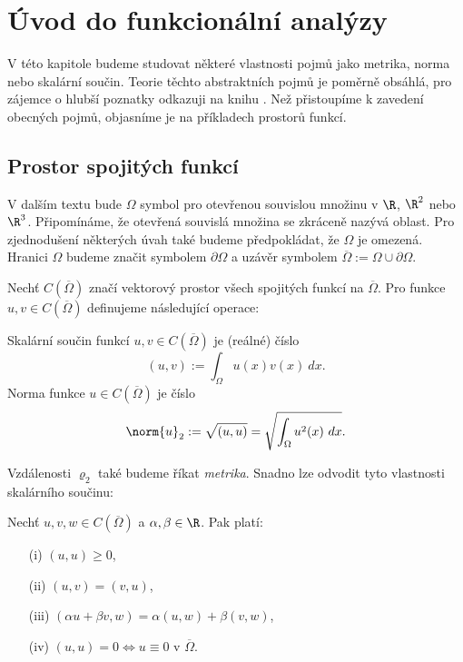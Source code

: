 \section{Úvod do funkcionální analýzy}


V této kapitole budeme studovat některé vlastnosti pojmů jako metrika, norma nebo skalární součin.
Teorie těchto abstraktních pojmů je poměrně obsáhlá, pro zájemce o hlubší poznatky odkazuji na knihu \cite{rektorys1974variacni}.
Než přistoupíme k zavedení obecných pojmů, objasníme je na příkladech prostorů funkcí.


\subsection{Prostor spojitých funkcí}
V dalším textu bude $\Omega$ symbol pro otevřenou souvislou množinu v $\R$, $\R^2$ nebo $\R^3$.
Připomínáme, že otevřená souvislá množina se zkráceně nazývá oblast.
Pro zjednodušení některých úvah také budeme předpokládat, že $\Omega$ je omezená.
Hranici $\Omega$ budeme značit symbolem $\partial\Omega$ a uzávěr symbolem $\overline\Omega:=\Omega\cup\partial\Omega$.

Nechť $C(\overline\Omega)$ značí vektorový prostor všech spojitých funkcí na $\overline\Omega$.
Pro funkce $u,v\in C(\overline\Omega)$ definujeme následující operace:

\begin{df}
\label{df:scal_norm_met_C}
Skalární součin funkcí $u,v\in C(\overline\Omega)$ je (reálné) číslo
\[ (u,v):=\int_\Omega u(x) v(x)~dx. \]
Norma funkce $u\in C(\overline\Omega)$ je číslo
\[ \norm{u}_2 := \sqrt{(u,u)} = \sqrt{\int_\Omega u^2(x)~dx}. \]
\end{df}
Vzdálenosti $\varrho_2$ také budeme říkat \emph{metrika}.
Snadno lze odvodit tyto vlastnosti skalárního součinu:
\begin{veta}
Nechť $u,v,w\in C(\overline\Omega)$ a $\alpha,\beta\in\R$. Pak platí:
\begin{itemize}
\item[(i)] $(u,u)\ge 0$,
\item[(ii)] $(u,v)=(v,u)$,
\item[(iii)] $(\alpha u + \beta v,w) = \alpha(u,w) + \beta(v,w)$,
\item[(iv)] $(u,u)=0\Leftrightarrow u\equiv0$ v $\overline\Omega$.
\end{itemize}
\end{veta}

